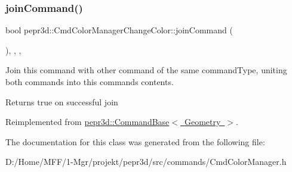 \subsubsection{\texorpdfstring{joinCommand()}{joinCommand()}}
{\footnotesize\ttfamily bool pepr3d\+::\+Cmd\+Color\+Manager\+Change\+Color\+::join\+Command (\begin{DoxyParamCaption}\item[{const \mbox{\hyperlink{classpepr3d_1_1_command_base}{Command\+Base}} \&}]{ }\end{DoxyParamCaption})\hspace{0.3cm}{\ttfamily [inline]}, {\ttfamily [override]}, {\ttfamily [protected]}, {\ttfamily [virtual]}}



Join this command with other command of the same command\+Type, uniting both commands into this command\textquotesingle{}s contents. 

\begin{DoxyReturn}{Returns}
true on successful join 
\end{DoxyReturn}


Reimplemented from \mbox{\hyperlink{classpepr3d_1_1_command_base_a9ef408154b7cb446e626e049f268abb4}{pepr3d\+::\+Command\+Base$<$ Geometry $>$}}.



The documentation for this class was generated from the following file\+:\begin{DoxyCompactItemize}
\item 
D\+:/\+Home/\+M\+F\+F/1-\/\+Mgr/projekt/pepr3d/src/commands/Cmd\+Color\+Manager.\+h\end{DoxyCompactItemize}
